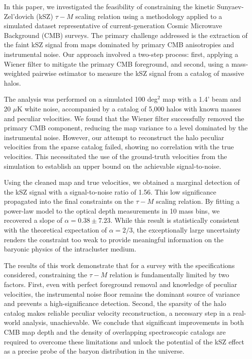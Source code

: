 \documentclass[]{article}
\begin{document}
In this paper, we investigated the feasibility of constraining the kinetic Sunyaev-Zel'dovich (kSZ) $\tau-M$ scaling relation using a methodology applied to a simulated dataset representative of current-generation Cosmic Microwave Background (CMB) surveys. The primary challenge addressed is the extraction of the faint kSZ signal from maps dominated by primary CMB anisotropies and instrumental noise. Our approach involved a two-step process: first, applying a Wiener filter to mitigate the primary CMB foreground, and second, using a mass-weighted pairwise estimator to measure the kSZ signal from a catalog of massive halos.

The analysis was performed on a simulated 100 deg$^2$ map with a 1.4' beam and 20 $\mu$K white noise, accompanied by a catalog of 5,000 halos with known masses and peculiar velocities. We found that the Wiener filter successfully removed the primary CMB component, reducing the map variance to a level dominated by the instrumental noise. However, our attempt to reconstruct the halo peculiar velocities from the sparse catalog failed, showing no correlation with the true velocities. This necessitated the use of the ground-truth velocities from the simulation to establish an upper bound on the achievable signal-to-noise.

Using the cleaned map and true velocities, we obtained a marginal detection of the kSZ signal with a signal-to-noise ratio of 1.56. This low significance propagated into the final constraints on the $\tau-M$ scaling relation. By fitting a power-law model to the optical depth measurements in 10 mass bins, we recovered a slope of $\alpha = 0.38 \pm 7.23$. While this result is statistically consistent with the theoretical expectation of $\alpha = 2/3$, the exceptionally large uncertainty renders the constraint too weak to provide meaningful information on the baryonic physics of the intracluster medium.

The results of this work demonstrate that for a survey with the specifications considered, constraining the $\tau-M$ relation is fundamentally limited by two factors. First, even with perfect foreground removal and knowledge of peculiar velocities, the instrumental noise floor remains the dominant source of variance and prevents a high-significance detection. Second, the sparsity of the halo catalog makes reliable peculiar velocity reconstruction, a necessary step in a real-world analysis, unachievable. We conclude that significant improvements in both CMB map depth and the density of overlapping spectroscopic catalogs are required to overcome these limitations and unlock the potential of the kSZ effect as a precise probe of the baryon distribution in the universe.
\end{document}
